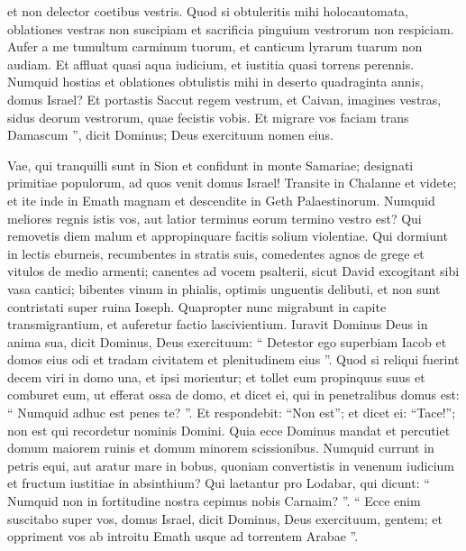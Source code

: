 \begin{biblechapter}
\begin{biblechapter}
\begin{biblechapter}
\begin{biblechapter}
\begin{biblechapter}
 et non delector coetibus vestris.
 \verse Quod si obtuleritis mihi holocautomata,
 oblationes vestras non suscipiam
 et sacrificia pinguium vestrorum non respiciam.
 \verse Aufer a me tumultum carminum tuorum,
 et canticum lyrarum tuarum non audiam.
 \verse Et affluat quasi aqua iudicium,
 et iustitia quasi torrens perennis.
 \verse Numquid hostias et oblationes obtulistis mihi in deserto
 quadraginta annis, domus Israel?
 \verse Et portastis Saccut regem vestrum,
 et Caivan, imagines vestras,
 sidus deorum vestrorum, quae fecistis vobis.
 \verse Et migrare vos faciam trans Damascum ”,
 dicit Dominus; Deus exercituum nomen eius.
 
\begin{biblechapter}
 \verse Vae, qui tranquilli sunt in Sion
 et confidunt in monte Samariae;
 designati primitiae populorum,
 ad quos venit domus Israel!
 \verse Transite in Chalanne et videte;
 et ite inde in Emath magnam
 et descendite in Geth Palaestinorum.
 Numquid meliores regnis istis vos,
 aut latior terminus eorum termino vestro est?
 \verse Qui removetis diem malum
 et appropinquare facitis solium violentiae.
 \verse Qui dormiunt in lectis eburneis,
 recumbentes in stratis suis,
 comedentes agnos de grege
 et vitulos de medio armenti;
 \verse canentes ad vocem psalterii,
 sicut David excogitant sibi vasa cantici;
 \verse bibentes vinum in phialis,
 optimis unguentis delibuti,
 et non sunt contristati super ruina Ioseph.
 \verse Quapropter nunc migrabunt in capite transmigrantium,
 et auferetur factio lascivientium.
 \verse Iuravit Dominus Deus in anima sua,
 dicit Dominus, Deus exercituum:
 “ Detestor ego superbiam Iacob
 et domos eius odi
 et tradam civitatem et plenitudinem eius ”.
 \verse Quod si reliqui fuerint
 decem viri in domo una,
 et ipsi morientur;
 \verse et tollet eum propinquus suus
 et comburet eum, ut efferat ossa de domo,
 et dicet ei, qui in penetralibus domus est:
 “ Numquid adhuc est penes te? ”.
 Et respondebit: “Non est”;
 et dicet ei: “Tace!”;
 non est qui recordetur nominis Domini.
 \verse Quia ecce Dominus mandat
 et percutiet domum maiorem ruinis
 et domum minorem scissionibus.
 \verse Numquid currunt in petris equi,
 aut aratur mare in bobus,
 quoniam convertistis in venenum iudicium
 et fructum iustitiae in absinthium?
 \verse Qui laetantur pro Lodabar,
 qui dicunt: “ Numquid non in fortitudine nostra
 cepimus nobis Carnaim? ”.
 \verse “ Ecce enim suscitabo super vos, domus Israel,
 dicit Dominus, Deus exercituum, gentem;
 et oppriment vos ab introitu Emath
 usque ad torrentem Arabae ”.
 

\end{biblechapter}
\end{biblechapter}
\end{biblechapter}
\end{biblechapter}
\end{biblechapter}
\end{biblechapter}
